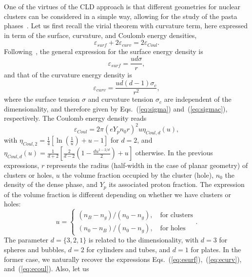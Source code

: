 One of the virtues of the CLD approach is that different geometries for nuclear
clusters can be considered in a simple way, allowing for the study of the pasta
phases~\cite{Ravenhall1983, Lattimer1991, Lorenz1993, Newton2012}. Let us first 
recall the virial theorem with curvature term, here expressed in term of the 
surface, curvature, and Coulomb energy densities,
%
\begin{equation}
  \varepsilon_{surf} + 2\varepsilon_{curv} =
  2\varepsilon_{Coul}.\label{eq:virdens}
\end{equation}
%
Following~\cite{Ravenhall1983,Newton2012}, the general expression for the 
surface energy density is
%
\begin{equation}
  \varepsilon_{surf} = \frac{ud\sigma}{r},
\end{equation}
%
and that of the curvature energy density is
%
\begin{equation}
  \varepsilon_{curv} = \frac{ud(d-1)\sigma_c}{{r}^2},
\end{equation}
%
where the surface tension $\sigma$ and curvature tension $\sigma_c$ are
independent of the dimensionality, and therefore given by 
Eqs.~(\ref{eq:sigma}) and~(\ref{eq:sigmac}), respectively. The Coulomb energy 
density reads
%
\begin{equation}
  \varepsilon_{Coul} = 2\pi(eY_pn_0r)^2u\eta_{Coul,d}(u),
\end{equation}
%
with $\eta_{Coul,2} = \frac{1}{4}\left[\ln\left(\frac{1}{u}\right) + u 
- 1\right]$ for $d=2$, and $\eta_{Coul,d}(u) =
\frac{1}{d+2}\left[\frac{2}{d-2}\left(1-\frac{du^{1-2/d}}{2}\right) +
u\right]$ otherwise. 
In the previous expressions, $r$ represents the radius (half-width in the
case of planar geometry) of clusters or holes,
$u$ the volume fraction occupied by the cluster (hole), $n_0$ the density of 
the dense phase, and $Y_p$ its associated proton fraction. The expression of 
the volume fraction is different depending on whether we have clusters or 
holes:
%
\begin{equation}
  u =
    \begin{cases}
      (n_B-n_g)/(n_0-n_g), \quad \text{for clusters}\\
      (n_0-n_B)/(n_0-n_g), \quad \text{for holes}
    \end{cases}. 
\end{equation}
%
The parameter $d=\{3,2,1\}$ is related to the dimensionality, 
with $d=3$ for spheres and bubbles, $d=2$ for cylinders and
tubes, and $d=1$ for plates. In the former case, we naturally recover the 
expressions Eqs.~(\ref{eq:esurf}),~(\ref{eq:ecurv}), and~(\ref{eq:ecoul}). Also, let us
